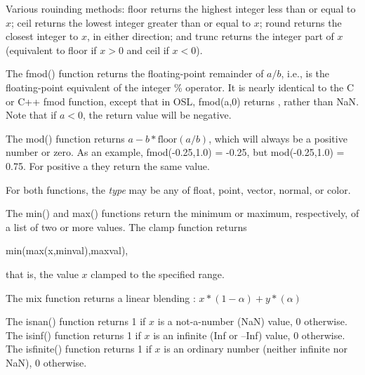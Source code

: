 \documentclass[11pt,letterpaper]{book}
\def\color{{\cf color}\xspace}
\def\normal{{\cf normal}\xspace}
\def\point{{\cf point}\xspace}
\def\vector{{\cf vector}\xspace}
\begin{document}
Various rouinding methods: {\cf floor} returns the highest integer less
than or equal to $x$; {\cf ceil} returns the lowest integer greater than
or equal to $x$; {\cf round} returns the closest integer to $x$, in
either direction; and {\cf trunc} returns the integer part of $x$
(equivalent to {\cf floor} if $x>0$ and {\cf ceil} if $x<0$).
\apiend


The {\cf fmod()} function returns the floating-point remainder of $a/b$,
i.e., is the floating-point equivalent of the integer {\cf \%} operator.
It is nearly identical to the C or C++ {\cf fmod} function, except that
in OSL, {\cf fmod(a,0)} returns {}, rather than {\cf NaN}.  Note
that if $a < 0$, the return value will be negative.

The {\cf mod()} function returns $a - b*\mbox{floor}(a/b)$, which will
always be a positive number or zero.  
As an example, {\cf fmod(-0.25,1.0) = -0.25}, but {\cf mod(-0.25,1.0) =
  0.75}.  For positive {\cf a} they return the same value.

For both functions, the \emph{type} may be any of {\cf float}, \point,
\vector, \normal, or \color.
\apiend

  
The {\cf min()} and {\cf max()} functions return the minimum or maximum,
respectively, of a list of two or more values.  The {\cf clamp}
function returns

\hspace{2em} {\cf min(max(x,minval),maxval)},

\noindent that is, the value $x$ clamped to the specified range.
\apiend

The {\cf mix} function returns a linear blending :
$ x*(1-\alpha) + y*(\alpha) $
\apiend

  
The {\cf isnan()} function returns 1 if $x$ is a not-a-number (NaN)
value, 0 otherwise.  The {\cf isinf()} function returns 1 if $x$ is an
infinite (Inf or --Inf) value, 0 otherwise.  The {\cf isfinite()}
function returns 1 if $x$ is an ordinary number (neither infinite nor
NaN), 0 otherwise.  \apiend
\end{document}
